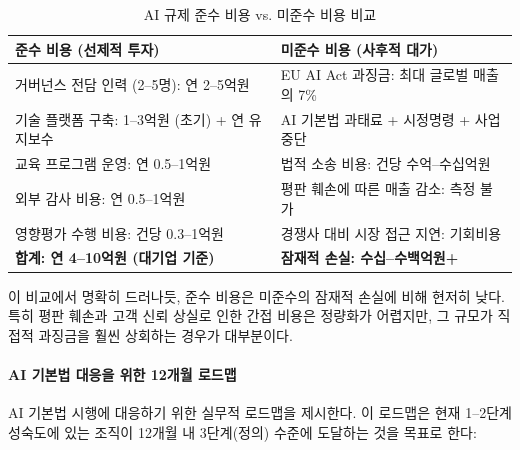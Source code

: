 \begin{table}[htbp]
\centering
\caption{AI 규제 준수 비용 vs. 미준수 비용 비교}
\label{tab:compliance_cost}
\begin{tabularx}{\textwidth}{|X|X|}
\hline
\textbf{준수 비용 (선제적 투자)} & \textbf{미준수 비용 (사후적 대가)} \\ \hline
거버넌스 전담 인력 (2--5명): 연 2--5억원 & EU AI Act 과징금: 최대 글로벌 매출의 7\% \\ \hline
기술 플랫폼 구축: 1--3억원 (초기) + 연 유지보수 & AI 기본법 과태료 + 시정명령 + 사업 중단 \\ \hline
교육 프로그램 운영: 연 0.5--1억원 & 법적 소송 비용: 건당 수억--수십억원 \\ \hline
외부 감사 비용: 연 0.5--1억원 & 평판 훼손에 따른 매출 감소: 측정 불가 \\ \hline
영향평가 수행 비용: 건당 0.3--1억원 & 경쟁사 대비 시장 접근 지연: 기회비용 \\ \hline
\textbf{합계: 연 4--10억원 (대기업 기준)} & \textbf{잠재적 손실: 수십--수백억원+} \\ \hline
\end{tabularx}
\end{table}

이 비교에서 명확히 드러나듯, 준수 비용은 미준수의 잠재적 손실에 비해 현저히 낮다. 특히 평판 훼손과 고객 신뢰 상실로 인한 간접 비용은 정량화가 어렵지만, 그 규모가 직접적 과징금을 훨씬 상회하는 경우가 대부분이다.

\paragraph{AI 기본법 대응을 위한 12개월 로드맵}
AI 기본법 시행에 대응하기 위한 실무적 로드맵을 제시한다. 이 로드맵은 현재 1--2단계 성숙도에 있는 조직이 12개월 내 3단계(정의) 수준에 도달하는 것을 목표로 한다:

